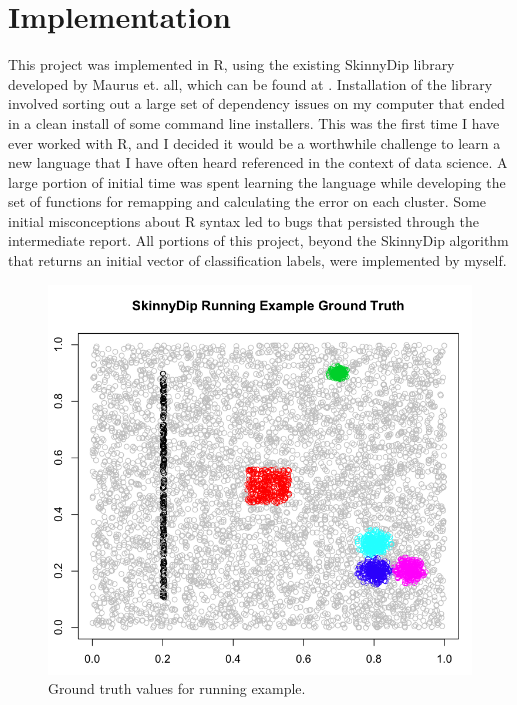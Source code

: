 \documentclass{sig-alternate-05-2015}
\begin{document}
\section{Implementation}
This project was implemented in R, using the existing SkinnyDip library developed by Maurus et. all, which can be found at \cite{skinnycode}. Installation of the library involved sorting out a large set of dependency issues on my computer that ended in a clean install of some command line installers. This was the first time I have ever worked with R, and I decided it would be a worthwhile challenge to learn a new language that I have often heard referenced in the context of data science. A large portion of initial time was spent learning the language while developing the set of functions for remapping and calculating the error on each cluster. Some initial misconceptions about R syntax led to bugs that persisted through the intermediate report. All portions of this project, beyond the SkinnyDip algorithm that returns an initial vector of classification labels, were implemented by myself.


\begin{figure}[t]
\centering
\includegraphics[width=\columnwidth]{images/RunningExampleGT}
\caption{Ground truth values for running example.}
\label{fig:runningGT}
\end{figure}
\end{document}
